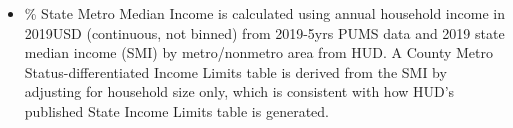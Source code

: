 \begin{itemize}
\item \% State Metro Median Income is calculated using annual household income in 2019USD (continuous, not binned) from 2019-5yrs PUMS data and 2019 state median income (SMI) by metro/nonmetro area from HUD. A County Metro Status-differentiated Income Limits table is derived from the SMI by adjusting for household size only, which is consistent with how HUD's published State Income Limits table is generated.
\end{itemize}
